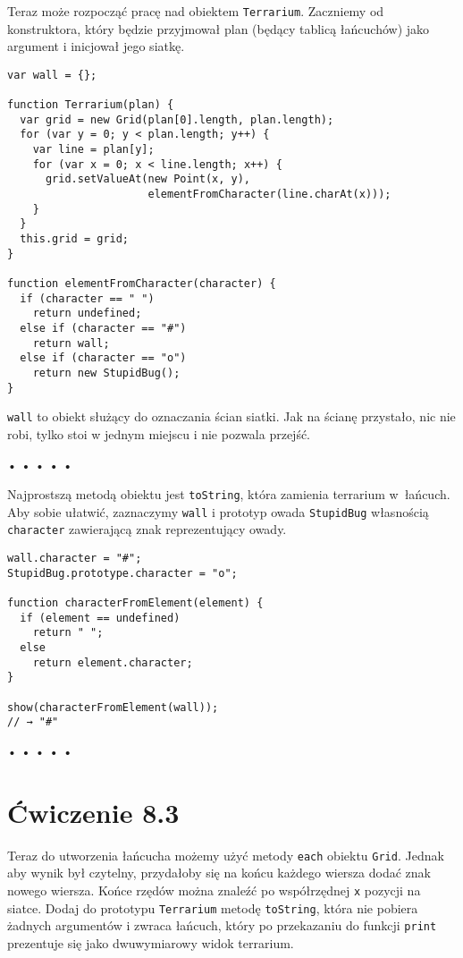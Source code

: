   
Teraz może rozpocząć pracę nad obiektem \texttt{Terrarium}. Zaczniemy od konstruktora, który będzie przyjmował plan (będący tablicą łańcuchów)  jako argument i inicjował jego siatkę.

  
\begin{verbatim} 
var wall = {};

function Terrarium(plan) {
  var grid = new Grid(plan[0].length, plan.length);
  for (var y = 0; y < plan.length; y++) {
    var line = plan[y];
    for (var x = 0; x < line.length; x++) {
      grid.setValueAt(new Point(x, y),
                      elementFromCharacter(line.charAt(x)));
    }
  }
  this.grid = grid;
}

function elementFromCharacter(character) {
  if (character == " ")
    return undefined;
  else if (character == "#")
    return wall;
  else if (character == "o")
    return new StupidBug();
}
\end{verbatim}
  
\texttt{wall} to obiekt służący do oznaczania ścian siatki. Jak na ścianę przystało, nic nie robi, tylko stoi w jednym miejscu i nie pozwala przejść.



\begin{center}
• • • • •
\end{center}

  
Najprostszą metodą obiektu jest \texttt{toString}, która zamienia terrarium w~łańcuch. Aby sobie ułatwić, zaznaczymy \texttt{wall} i prototyp owada \texttt{StupidBug} własnością \texttt{character} zawierającą znak reprezentujący owady.

  
\begin{verbatim} 
wall.character = "#";
StupidBug.prototype.character = "o";

function characterFromElement(element) {
  if (element == undefined)
    return " ";
  else
    return element.character;
}

show(characterFromElement(wall));
// → "#"
\end{verbatim}


\begin{center}
• • • • •
\end{center}

  
\section*{Ćwiczenie 8.3}
\label{sec:8.3}
  
    
Teraz do utworzenia łańcucha możemy użyć metody \texttt{each} obiektu \texttt{Grid}. Jednak aby wynik był czytelny, przydałoby się na końcu każdego wiersza dodać znak nowego wiersza. Końce rzędów można znaleźć po współrzędnej \texttt{x} pozycji na siatce. Dodaj do prototypu \texttt{Terrarium} metodę \texttt{toString}, która nie pobiera żadnych argumentów i zwraca łańcuch, który po przekazaniu do funkcji \texttt{print} prezentuje się jako dwuwymiarowy widok terrarium.

